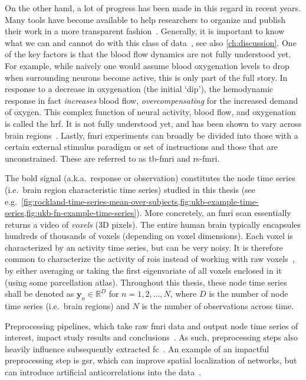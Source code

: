 On the other hand, a lot of progress has been made in this regard in recent years.
Many tools have become available to help researchers to organize and publish their work in a more transparent fashion~\parencite{Marcus2011, Kumar2022, Niso2022}.
Generally, it is important to know what we can and cannot do with this class of data~\parencite{Logothetis2008}, see also \cref{ch:discussion}.
%
One of the key factors is that the blood flow dynamics are not fully understood yet.
For example, while naively one would assume blood oxygenation levels to drop when surrounding neurons become active, this is only part of the full story.
In response to a decrease in oxygenation (the initial `dip'), the hemodynamic response in fact \emph{increases} blood flow, \emph{overcompensating} for the increased demand of oxygen.
This complex function of neural activity, blood flow, and oxygenation is called the \gls{hrf}.
It is not fully understood yet, and has been shown to vary across brain regions~\parencite{Handwerker2004}.
%
Lastly, \gls{fmri} experiments can broadly be divided into those with a certain external stimulus paradigm or set of instructions and those that are unconstrained.
These are referred to as \gls{tb-fmri} and \gls{rs-fmri}.

The \gls{bold} signal (a.k.a.~response or observation) constitutes the node time series (i.e.~brain region characteristic time series) studied in this thesis (see e.g.~\cref{fig:rockland-time-series-mean-over-subjects,fig:ukb-example-time-series,fig:ukb-fn-example-time-series}).
More concretely, an \gls{fmri} scan essentially returns a video of \emph{voxels} (3D pixels).
The entire human brain typically encapsules hundreds of thousands of voxels (depending on voxel dimensions).
Each voxel is characterized by an activity time series, but can be very noisy.
It is therefore common to characterize the activity of \glspl{roi} instead of working with raw voxels~\parencite{Korhonen2017}, by either averaging or taking the first eigenvariate of all voxels enclosed in it (using some parcellation atlas).
Throughout this thesis, these node time series shall be denoted as $\mathbf{y}_n \in \mathbb{R}^D$ for $n = 1, 2, \ldots , N$, where $D$ is the number of node time series (i.e.~brain regions) and $N$ is the number of observations across time.

Preprocessing pipelines, which take raw \gls{fmri} data and output node time series of interest, impact study results and conclusions~\parencite{Caballero-Gaudes2017}.
As such, preprocessing steps also heavily influence subsequently extracted \gls{fc}~\parencite{Aquino2022}.
An example of an impactful preprocessing step is \gls{gsr}, which can improve spatial localization of networks, but can introduce artificial anticorrelations into the data~\parencite{Murphy2009}.

